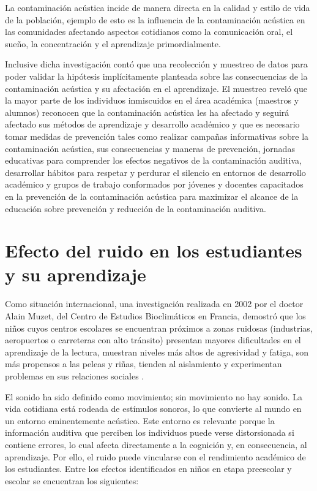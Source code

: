 {{La contaminación acústica incide de manera directa en la calidad y estilo de vida de la población, ejemplo de esto es la influencia de la contaminación acústica en las comunidades afectando aspectos cotidianos como la comunicación oral, el sueño, la concentración y el aprendizaje primordialmente. 

Inclusive dicha investigación contó que una recolección y muestreo de datos para poder validar la hipótesis implícitamente planteada sobre las consecuencias de la contaminación acústica y su afectación en el aprendizaje. El muestreo reveló que la mayor parte de los individuos inmiscuidos en el área académica (maestros y alumnos) reconocen que la contaminación acústica les ha afectado y seguirá afectado sus métodos de aprendizaje y desarrollo académico y que es necesario tomar medidas de prevención tales como realizar campañas informativas sobre la contaminación acústica, sus consecuencias y maneras de prevención, jornadas educativas para comprender los efectos negativos de la contaminación auditiva, desarrollar hábitos para respetar y perdurar el silencio en entornos de desarrollo académico y grupos de trabajo conformados por jóvenes y docentes capacitados en la prevención de la contaminación acústica para maximizar el alcance de la educación sobre prevención y reducción de la contaminación auditiva. \parencite{duque2023}

\section{Efecto del ruido en los estudiantes y su aprendizaje} 

Como situación internacional, una investigación realizada en 2002 por el doctor Alain Muzet, del Centro de Estudios Bioclimáticos en Francia, demostró que los niños cuyos centros escolares se encuentran próximos a zonas ruidosas (industrias, aeropuertos o carreteras con alto tránsito) presentan mayores dificultades en el aprendizaje de la lectura, muestran niveles más altos de  agresividad y fatiga, son más propensos a las peleas y riñas, tienden al aislamiento y experimentan problemas en sus relaciones sociales \parencite{marcelo2009ruido}.

El sonido ha sido definido como movimiento; sin movimiento no hay sonido. La vida cotidiana está rodeada de estímulos sonoros, lo que convierte al mundo en un entorno eminentemente acústico. Este entorno es relevante porque la información auditiva que perciben los individuos puede verse distorsionada si contiene errores, lo cual afecta directamente a la cognición y, en consecuencia, al aprendizaje. Por ello, el ruido puede vincularse con el rendimiento académico de los estudiantes. Entre los efectos identificados en niños en etapa preescolar y escolar se encuentran los siguientes:

}}
